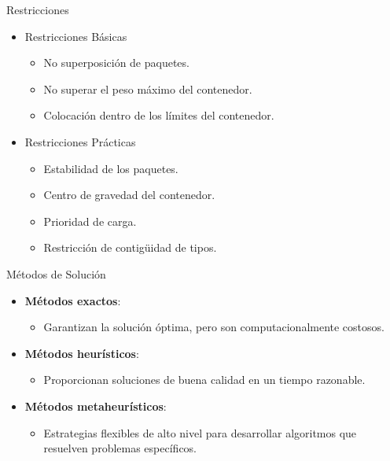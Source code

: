 \documentclass[handout]{beamer}
\begin{document}
\begin{frame}{Restricciones}
    \begin{itemize}[<+-| alert@+>]
        \item Restricciones Básicas
              \begin{itemize}
                  \item No superposición de paquetes.
                  \item No superar el peso máximo del contenedor.
                  \item Colocación dentro de los límites del contenedor.
              \end{itemize}
        \item Restricciones Prácticas
              \begin{itemize}
                  \item Estabilidad de los paquetes.
                  \item Centro de gravedad del contenedor.
                  \item Prioridad de carga.
                  \item Restricción de contigüidad de tipos.
              \end{itemize}
    \end{itemize}
\end{frame}

\begin{frame}{Métodos de Solución}
    \begin{itemize}[<+-| alert@+>]
        \item \textbf{Métodos exactos}:
              \begin{itemize}
                  \item Garantizan la solución óptima, pero son computacionalmente costosos.
              \end{itemize}
        \item \textbf{Métodos heurísticos}:
              \begin{itemize}
                  \item Proporcionan soluciones de buena calidad en un tiempo razonable.
              \end{itemize}
        \item \textbf{Métodos metaheurísticos}:
              \begin{itemize}
                  \item Estrategias flexibles de alto nivel para desarrollar algoritmos que resuelven problemas específicos.
              \end{itemize}
    \end{itemize}
\end{frame}
\end{document}
